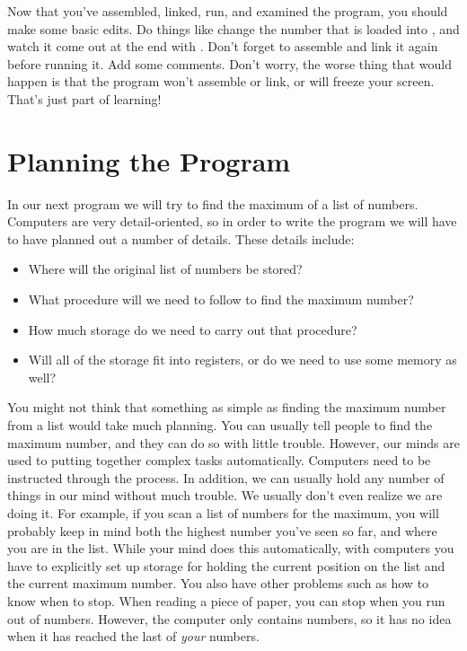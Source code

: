 Now that you've assembled, linked, run, and examined the program, you
should make some basic edits.  Do things like change the number 
that is loaded into \icode{{\ebxBare}}, and watch it come out
at the end with .  Don't forget
to assemble and link it again before running it.
Add some comments.  Don't worry, the worse thing that would happen is that the 
program won't assemble or link, or will freeze your screen.  That's just
part of learning!

\section{Planning the Program}

In our next program we will try to find the maximum of a list of numbers.
Computers are very detail-oriented, so in order to write the program we
will have to have planned out a number of details.  These details include:

\begin{itemize}\item Where will the original list of numbers be stored? 
\item What procedure will we need to follow to find the maximum number? 
\item How much storage do we need to carry out that procedure? 
\item Will all of the storage fit into registers, or do we need to use some memory as well? 
\end{itemize}

You might not think that something as simple as finding the maximum number from
a list would take much planning.  You can usually tell people to find the 
maximum number, and they can do so with little trouble.  However, our minds
are used to putting together complex tasks automatically.  Computers need
to be instructed through the process.  In addition, we can usually hold any
number of things in our mind without much trouble.  We usually don't even
realize we are doing it.  For example, if you scan a list of numbers for the
maximum, you will probably keep in mind both the highest number you've seen
so far, and where you are in the list.  While your mind does this
automatically, with computers you have to explicitly set up storage for holding
the current position on the list and the current maximum number.  You also
have other problems such as how to know when to stop.  When reading a piece
of paper, you can stop when you run out of numbers.  However, the computer
only contains numbers, so it has no idea when it has reached the last of 
\emph{your} numbers.

